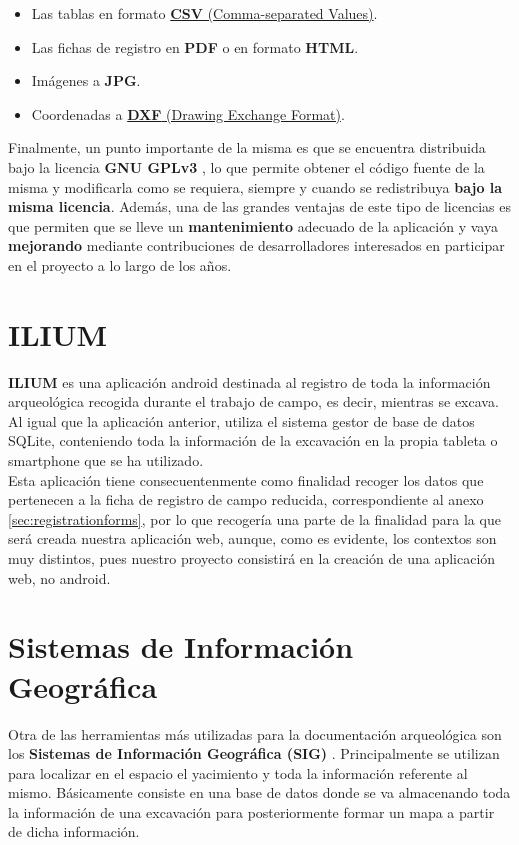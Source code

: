     \begin{itemize}
        \item Las tablas en formato \href{https://dev.socrata.com/docs/formats/csv.html}
        {\textbf{CSV} (Comma-separated Values)}.
        \item Las fichas de registro en \textbf{PDF} o en formato \textbf{HTML}.
        \item Imágenes a \textbf{JPG}.
        \item Coordenadas a \href{https://docs.fileformat.com/cad/dxf/}
        {\textbf{DXF} (Drawing Exchange Format)}.
    \end{itemize}

Finalmente, un punto importante de la misma es que se encuentra distribuida bajo la
licencia \textbf{GNU GPLv3} \cite{gplv3}, lo que permite obtener el código fuente de
la misma y modificarla como se requiera, siempre y cuando se redistribuya \textbf{bajo la
misma licencia}. Además, una de las grandes ventajas de este tipo de licencias es que
permiten que se lleve un \textbf{mantenimiento} adecuado de la aplicación y vaya
\textbf{mejorando} mediante contribuciones de desarrolladores interesados en participar en
el proyecto a lo largo de los años. \\


\section{ILIUM}
\textbf{ILIUM} \cite{ilium} es una aplicación android destinada al registro de toda la
información arqueológica recogida durante el trabajo de campo, es decir, mientras se
excava. Al igual que la aplicación anterior, utiliza el sistema gestor de base de datos
SQLite, conteniendo toda la información de la excavación en la propia tableta o smartphone
que se ha utilizado.\\

Esta aplicación tiene consecuentenmente como finalidad recoger los datos que pertenecen a
la ficha de registro de campo reducida, correspondiente al anexo \ref{sec:registrationforms},
por lo que recogería una parte de la finalidad para la que será creada nuestra aplicación web,
aunque, como es evidente, los contextos son muy distintos, pues nuestro proyecto consistirá
en la creación de una aplicación web, no android. \\


\section{Sistemas de Información Geográfica}
Otra de las herramientas más utilizadas para la documentación arqueológica son los
\textbf{Sistemas de Información Geográfica (SIG)} \cite{gis}. Principalmente se utilizan
para localizar en el espacio el yacimiento y toda la información referente al mismo.
Básicamente consiste en una base de datos donde se va almacenando toda la información de una
excavación para posteriormente formar un mapa a partir de dicha información. \\


